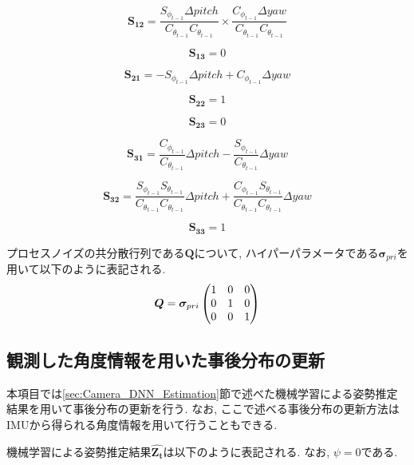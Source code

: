 \begin{equation}
            \bm{S_{12}} = \frac{S_{\phi_{t-1}} \Delta pitch}{C_{\theta_{t-1}} C_{\theta_{t-1}}} \times \frac{C_{\phi_{t-1}} \Delta yaw}{C_{\theta_{t-1}} C_{\theta_{t-1}}}
\end{equation}

\begin{equation}
    \bm{S_{13}} = 0
\end{equation}

\begin{equation}
    \bm{S_{21}} = -S_{\phi_{t-1}} \Delta pitch + C_{\phi_{t-1}} \Delta yaw
\end{equation}

\begin{equation}
    \bm{S_{22}} = 1
\end{equation}

\begin{equation}
    \bm{S_{23}} = 0
\end{equation}

\begin{equation}
    \bm{S_{31}} = \frac{C_{\phi_{t-1}}}{C_{\theta_{t-1}}} \Delta pitch - \frac{S_{\phi_{t-1}}}{C_{\theta_{t-1}}} \Delta yaw
\end{equation}

\begin{equation}
    \bm{S_{32}} = \frac{ S_{\phi_{t-1}}S_{\theta_{t-1}} }{ C_{\theta_{t-1}}C_{\theta_{t-1}} } \Delta pitch +  \frac{ C_{\phi_{t-1}}S_{\theta_{t-1}} }{ C_{\theta_{t-1}}C_{\theta_{t-1}} } \Delta yaw
\end{equation}

\begin{equation}
    \bm{S_{33}} = 1
\end{equation}

プロセスノイズの共分散行列である\(\bm{Q}\)について, ハイパーパラメータである$\bm{\sigma}_{pri}$を用いて以下のように表記される.
\begin{equation}
	\begin{split}
		\bm{Q}
		= \bm{\sigma}_{pri}
		\begin{pmatrix}
			1 & 0 & 0 \cr
			0 & 1 & 0 \cr
                0 & 0 & 1
		 \end{pmatrix}
	\end{split}
\end{equation}\label{eq:sigma_pri}
%

\subsection{観測した角度情報を用いた事後分布の更新}\label{sec:ekf_dnn}
本項目では\ref{sec:Camera_DNN_Estimation}節で述べた機械学習による姿勢推定結果を用いて事後分布の更新を行う. なお, ここで述べる事後分布の更新方法はIMUから得られる角度情報を用いて行うこともできる.\par
機械学習による姿勢推定結果$\hat{\bm{Z_{t}}}$は以下のように表記される. なお, $\psi=0$である.

